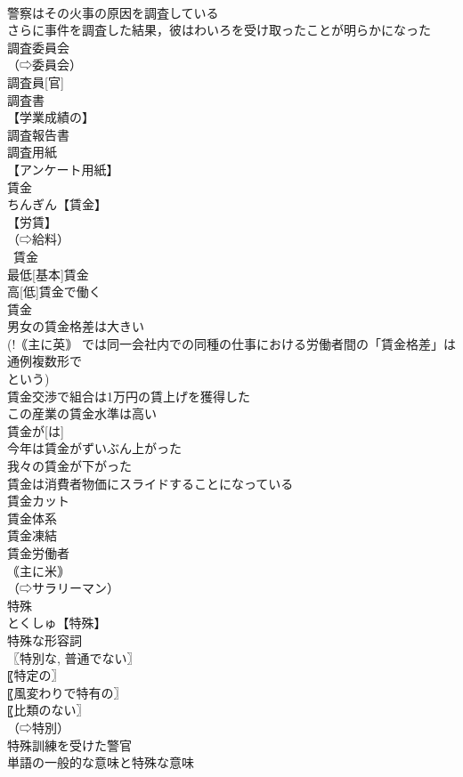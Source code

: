 \documentclass[8pt]{extreport}
\begin{document}
\begin{CJK}{UTF8}{min}
\\	警察はその火事の原因を調査している
\\	さらに事件を調査した結果，彼はわいろを受け取ったことが明らかになった
\\	調査委員会
\\	（⇨委員会）
\\	調査員[官]
\\	調査書
\\	【学業成績の】
\\	調査報告書
\\	調査用紙
\\	【アンケート用紙】
\\	賃金		
\\	ちんぎん【賃金】
\\	【労賃】
\\	（⇨給料）
\\	~賃金
\\	最低[基本]賃金
\\	高[低]賃金で働く
\\	賃金~
\\	男女の賃金格差は大きい
\\	(!｟主に英｠ では同一会社内での同種の仕事における労働者間の「賃金格差」は通例複数形で 
\\	という)
\\	賃金交渉で組合は1万円の賃上げを獲得した
\\	この産業の賃金水準は高い
\\	賃金が[は]
\\	今年は賃金がずいぶん上がった
\\	我々の賃金が下がった
\\	賃金は消費者物価にスライドすることになっている
\\	賃金カット
\\	賃金体系
\\	賃金凍結
\\	賃金労働者
\\	｟主に米｠
\\	（⇨サラリーマン）
\\	特殊		
\\	とくしゅ【特殊】
\\	特殊な形容詞
\\	〖特別な, 普通でない〗
\\	〖特定の〗
\\	〖風変わりで特有の〗
\\	〖比類のない〗
\\	（⇨特別）
\\	特殊訓練を受けた警官
\\	単語の一般的な意味と特殊な意味

\end{CJK}
\end{document}
